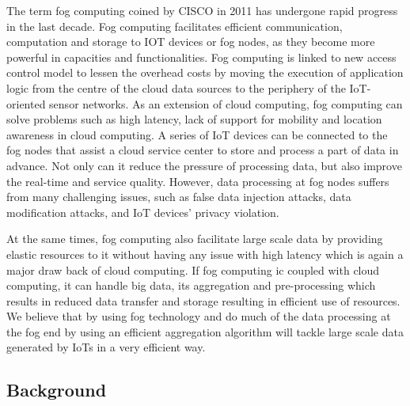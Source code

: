 \documentclass[10pt]{llncs}
\begin{document}
The term fog computing coined by CISCO in 2011 has undergone rapid progress in the last decade. Fog computing facilitates efficient communication, computation and storage to IOT devices or fog nodes, as they become more powerful in capacities and functionalities. Fog computing is linked to new access control model to lessen the overhead costs by moving the execution of application logic from the centre of the cloud data sources to the periphery of the IoT-oriented sensor networks. As an extension of cloud computing, fog computing can solve problems such as high latency, lack of support for mobility and location awareness in cloud computing. A series of IoT devices can be connected to the fog nodes that assist a cloud service center to store and process a part of data in advance. Not only can it reduce the pressure of processing data, but also improve the real-time and service quality. However, data processing at fog nodes suffers from many challenging issues, such as false data injection attacks, data modification attacks, and IoT devices’ privacy violation.

At the same times, fog computing also facilitate large scale data by providing elastic resources to it without having any issue with high latency which is again a major draw back of cloud computing. If fog computing ic coupled with cloud computing, it can handle big data, its aggregation and pre-processing which results in reduced data transfer and storage resulting in efficient use of resources. We believe that by using fog technology and do much of the data processing at the fog end by using an efficient aggregation algorithm will tackle large scale data generated by IoTs in a very efficient way.

%
\subsection{Background}

%

%

%
\end{document}
